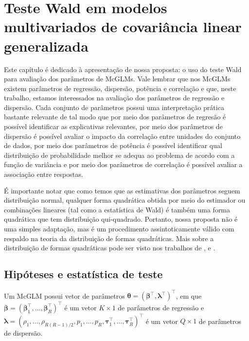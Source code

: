 
\chapter{Teste Wald em modelos multivariados de covariância linear generalizada}\label{cap:proposta}


Este capítulo é dedicado à apresentação de nossa proposta: o uso do teste Wald para avaliação dos parâmetros de McGLMs. Vale lembrar que nos McGLMs existem parâmetros de regressão, dispersão, potência e correlação e que, neste trabalho, estamos interessados na avaliação dos parâmetros de regressão e dispersão. Cada conjunto de parâmetros possui uma interpretação prática bastante relevante de tal modo que por meio dos parâmetros de regresão é possível identificar as explicativas relevantes, por meio dos parâmetros de dispersão é possível avaliar o impacto da correlação entre unidades do conjunto de dados, por meio dos parâmetros de potência é possível identificar qual distribuição de probabilidade melhor se adequa ao problema de acordo com a função de variância e por meio dos parâmetros de correlação é possível avaliar a associação entre respostas.

É importante notar que como temos que as estimativas dos parâmetros seguem distribuição normal, qualquer forma quadrática obtida por meio do estimador ou combinações lineares (tal como a estatística de Wald) é também uma forma quadrática que tem distribuição qui-quadrado. Portanto, nossa proposta não é uma simples adaptação, mas é um procedimento assintoticamente válido com respaldo na teoria da distribuição de formas quadráticas. Mais sobre a distribuição de formas quadráticas pode ser visto nos trabalhos de \citet{graybill1957idempotent}, \citet{luther1965decomposition} e \citet{baldessari1967distribution}.


\section{Hipóteses e estatística de teste}

Um McGLM possui vetor de parâmetros $\boldsymbol{\theta} = (\boldsymbol{\beta}^{\top}, \boldsymbol{\lambda}^{\top})^{\top}$, em que $\boldsymbol{\beta} = (\boldsymbol{\beta}_1^\top, \ldots, \boldsymbol{\beta}_R^\top)^\top$ é um vetor $K \times 1$ de parâmetros de regressão e $\boldsymbol{\lambda} = (\rho_1, \ldots, \rho_{R(R-1)/2}, p_1, \ldots, p_R, \boldsymbol{\tau}_1^\top, \ldots, \boldsymbol{\tau}_R^\top)^\top$ é um vetor $Q \times 1$ de parâmetros de dispersão.

